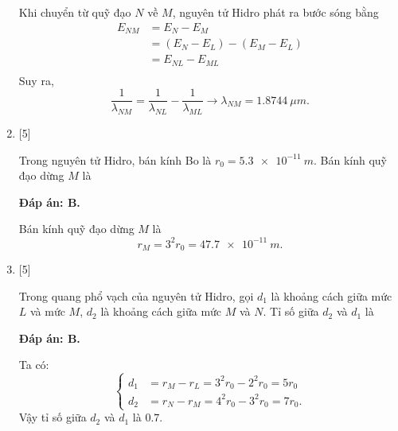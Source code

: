 \begin{enumerate}[label=\bfseries Câu \arabic*:]
{Khi chuyển từ quỹ đạo $ N $ về $ M $, nguyên tử Hidro phát ra bước sóng bằng
	\begin{align*}
		E_{NM} &= E_{N} - E_{M} \\
		&= \left( E_{N} - E_{L} \right) - \left( E_{M} - E_{L} \right) \\
		&= E_{NL} - E_{ML} \\
	\end{align*}
Suy ra,
	\begin{equation*}
		\dfrac{1}{\lambda_{NM}} = \dfrac{1}{\lambda_{NL}} - \dfrac{1}{\lambda_{ML}} \rightarrow \lambda_{NM} = \SI{1,8744}{\mu m}.  
	\end{equation*}
		}
		
		\item {} [5]
	
		\cauhoi
		{Trong nguyên tử Hidro, bán kính Bo là $ r_{0} = \SI{5,3e-11}{m} $. Bán kính quỹ đạo dừng $ M $ là
		}
	
		\loigiai
		{		\textbf{Đáp án: B.}

Bán kính quỹ đạo dừng $ M $ là
	\begin{equation*}
		r_{M} = 3^{2} r_{0} = \SI{47,7e-11}{m}.
	\end{equation*}
		}

		\item {} [5]
	
		\cauhoi
		{Trong quang phổ vạch của nguyên tử Hidro, gọi $ d_{1} $ là khoảng cách giữa mức $ L $ và mức $ M $, $ d_{2} $ là khoảng cách giữa mức $ M $ và $ N $. Tỉ số giữa $ d_{2} $ và $ d_{1} $ là 
		}
	
		\loigiai
		{		\textbf{Đáp án: B.}

Ta có:
$$
\left\{
	\begin{aligned}
		d_{1} &= r_{M} - r_{L} = 3^{2} r_{0} - 2^{2} r_{0} = 5 r_{0} \\
		d_{2} &= r_{N} - r_{M} = 4^{2} r_{0} - 3^{2} r_{0} = 7 r_{0}.
	\end{aligned}
\right.
$$
Vậy tỉ số giữa $ d_{2} $ và $ d_{1} $ là $ \num{0,7}. $
		}


\end{enumerate}
